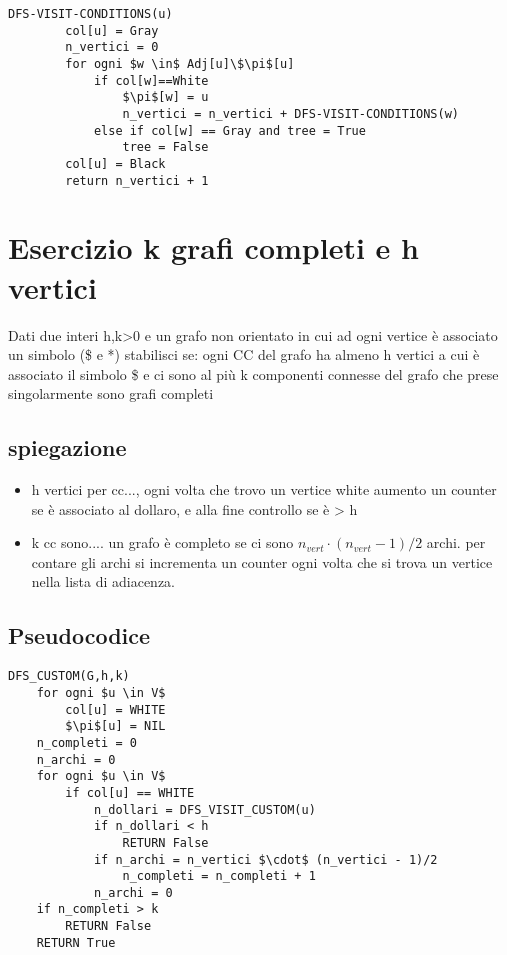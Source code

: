 \documentclass[12pt, a4paper, openany]{book}
\begin{document}
    \begin{lstlisting}[mathescape=true]
    DFS-VISIT-CONDITIONS(u)
        col[u] = Gray
        n_vertici = 0
        for ogni $w \in$ Adj[u]\$\pi$[u]
            if col[w]==White
                $\pi$[w] = u
                n_vertici = n_vertici + DFS-VISIT-CONDITIONS(w)
            else if col[w] == Gray and tree = True
                tree = False
        col[u] = Black
        return n_vertici + 1
    \end{lstlisting}

    \section{Esercizio k grafi completi e h vertici}
    Dati due interi h,k>0 e un grafo non orientato  in cui ad ogni vertice è associato un simbolo (\$ e *)
    stabilisci se: ogni CC del grafo ha almeno h vertici a cui è associato il simbolo \$
    e ci sono al più k componenti connesse del grafo che prese singolarmente sono grafi completi

    \subsection*{spiegazione}
    \begin{itemize}
        \item h vertici per cc..., ogni volta che trovo un vertice white aumento un counter se è associato al dollaro, e alla fine controllo se è > h
        \item k cc sono.... un grafo è completo se ci sono $n_{vert} \cdot (n_{vert} -1)/2$ archi. per contare gli archi si incrementa un counter ogni volta che si trova un vertice nella lista di adiacenza.
    \end{itemize}

    \subsection*{Pseudocodice}
    \begin{lstlisting}[mathescape=true]
DFS_CUSTOM(G,h,k)
    for ogni $u \in V$
        col[u] = WHITE
        $\pi$[u] = NIL
    n_completi = 0
    n_archi = 0
    for ogni $u \in V$
        if col[u] == WHITE
            n_dollari = DFS_VISIT_CUSTOM(u)
            if n_dollari < h
                RETURN False
            if n_archi = n_vertici $\cdot$ (n_vertici - 1)/2
                n_completi = n_completi + 1
            n_archi = 0
    if n_completi > k
        RETURN False
    RETURN True
\end{lstlisting}
\end{document}
